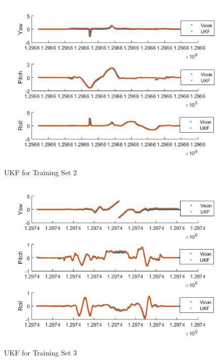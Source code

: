 \documentclass[fleqn,10pt]{SelfArx} %
\begin{document}
\begin{figure}[hbtp]
\centering
\includegraphics[scale=0.45]{2.jpg}
\caption{UKF for Training Set 2}
\label{fig:2}
\end{figure}

\begin{figure}[hbtp]
\centering
\includegraphics[scale=0.45]{3.jpg}
\caption{UKF for Training Set 3}
\label{fig:3}
\end{figure}
\end{document}
